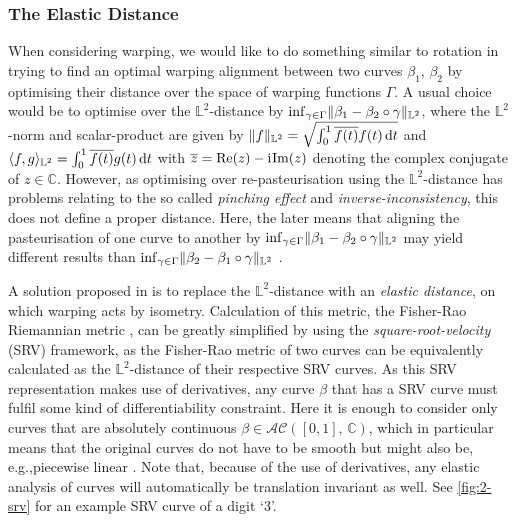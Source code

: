 \subsubsection*{The Elastic Distance}
When considering warping, we would like to do something similar to rotation in trying to find an optimal warping alignment between two curves $\beta_1$, $\beta_2$ by optimising their distance over the space of warping functions $\Gamma$.
A usual choice would be to optimise over the $\mathbb{L}^2$-distance by $\inf_{\gamma \in \Gamma} \lVert\beta_1 - \beta_2 \circ \gamma\rVert_{\mathbb{L}^2}$, where the $\mathbb{L}^2$-norm and scalar-product are given by $\lVert f\rVert_{\mathbb{L}^2} = \sqrt{\int_0^1 \overline{f(t)} f(t) \mathop{\mathrm{d}t}}$ and $\langle f,g\rangle_{\mathbb{L}^2} = \int_0^1 \overline{f(t)} g(t) \mathop{\mathrm{d}t}$ with $\overline{z} = \mathrm{Re}(z) - \mathrm{i}\mkern1mu \mathrm{Im}(z)$ denoting the complex conjugate of $z \in \mathbb{C}$.
However, as optimising over re-pasteurisation using the $\mathbb{L}^2$-distance has problems relating to the so called \emph{pinching effect} and \emph{inverse-inconsistency}, this does not define a proper distance.
Here, the later means that aligning the pasteurisation of one curve to another by $\inf_{\gamma \in \Gamma} \lVert\beta_1 - \beta_2 \circ \gamma\rVert_{\mathbb{L}^2}$ may yield different results than $\inf_{\gamma \in \Gamma} \lVert\beta_2 - \beta_1 \circ \gamma\rVert_{\mathbb{L}^2}$ \parencite[see][88-90]{SrivastavaKlassen2016}.

A solution proposed in \cite{SrivastavaEtAl2011} is to replace the $\mathbb{L}^2$-distance with an \emph{elastic distance}, on which warping acts by isometry.
Calculation of this metric, the Fisher-Rao Riemannian metric \parencite{Rao1945}, can be greatly simplified by using the \emph{square-root-velocity} (SRV) framework, as the Fisher-Rao metric of two curves can be equivalently calculated as the $\mathbb{L}^2$-distance of their respective SRV curves.
As this SRV representation makes use of derivatives, any curve $\beta$ that has a SRV curve must fulfil some kind of differentiability constraint.
Here it is enough to consider only curves that are absolutely continuous $\beta \in \mathcal{AC}([0,1],\, \mathbb{C})$, which in particular means that the original curves do not have to be smooth but might also be, e.g.,piecewise linear \parencite[see][91]{SrivastavaKlassen2016}.
Note that, because of the use of derivatives, any elastic analysis of curves will automatically be translation invariant as well.
See \cref{fig:2-srv} for an example SRV curve of a digit \enquote*{3}.

